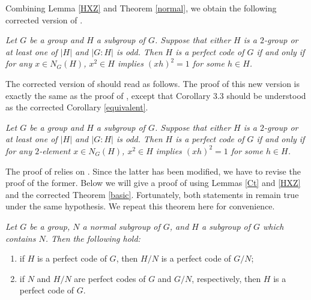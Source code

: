 \documentclass[12pt, a4paper]{article}
\theoremstyle{definition}
\newenvironment{manualtheorem}[1]{%
  \renewcommand\themanualtheoreminner{#1}%
  \manualtheoreminner
}{\endmanualtheoreminner}
\newenvironment{manualcoro}[1]{%
  \renewcommand\themanualcoroinner{#1}%
  \manualcoroinner
}{\endmanualcoroinner}
\begin{document}
Combining Lemma \ref{HXZ} and Theorem \ref{normal}, we obtain the following corrected version of \cite[Corollary 3.3]{ZZ21}.

\begin{manualcoro}{3.3}
\label{equivalent}
{\em Let $G$ be a group and $H$ a subgroup of $G$. Suppose that either $H$ is a $2$-group or at least one of $|H|$ and $|G:H|$ is odd. Then $H$ is a perfect code of $G$ if and only if for any $x\in N_{G}(H)$, $x^{2}\in H$ implies $(xh)^{2}=1$ for some $h\in H$.}
\end{manualcoro}

The corrected version of \cite[Corollary 3.4]{ZZ21} should read as follows. The proof of this new version is exactly the same as the proof of \cite[Corollary 3.4]{ZZ21}, except that Corollary 3.3 should be understood as the corrected Corollary \ref{equivalent}.

\begin{manualcoro}{3.4}
\label{equivalent2}
{\em Let $G$ be a group and $H$ a subgroup of $G$. Suppose that either $H$ is a $2$-group or at least one of $|H|$ and $|G:H|$ is odd. Then $H$ is a perfect code of $G$ if and only if for any $2$-element $x\in N_{G}(H)$, $x^{2}\in H$ implies $(xh)^{2}=1$ for some $h\in H$.}
\end{manualcoro}

The proof of \cite[Theorem 3.7]{ZZ21} relies on \cite[Corollary 3.3]{ZZ21}. Since the latter has been modified, we have to revise the proof of the former. Below we will give a proof of \cite[Theorem 3.7]{ZZ21} using Lemmas \ref{Ct} and \ref{HXZ} and the corrected Theorem \ref{basic}. Fortunately, both statements in \cite[Theorem 3.7]{ZZ21} remain true under the same hypothesis. We repeat this theorem here for convenience.

\begin{manualtheorem}{3.7}
\label{quotient}
{\em Let $G$ be a group, $N$ a normal subgroup of $G$, and $H$ a subgroup of $G$ which contains $N$. Then the following hold:
\begin{enumerate}[\rm (a)]
  \item if $H$ is a perfect code of $G$, then $H/N$ is a perfect code of $G/N$;
  \item if $N$ and $H/N$ are perfect codes of $G$ and $G/N$, respectively, then $H$ is a perfect code of $G$.
\end{enumerate}}
\end{manualtheorem}
\end{document}

